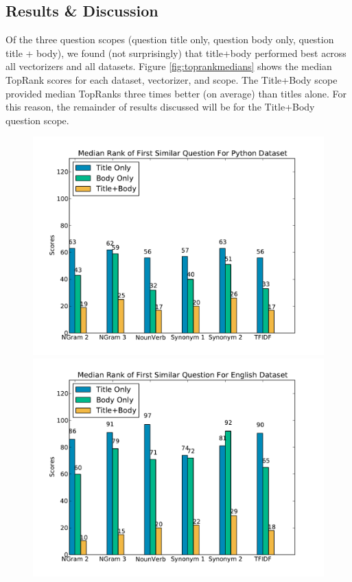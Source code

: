 \documentclass{acm_proc_article-sp}
\begin{document}
\subsection{Results \& Discussion}
Of the three question scopes (question title only, question body only, question title + body), we found (not surprisingly) that title+body performed best across all vectorizers and all datasets. Figure \ref{fig:toprankmedians} shows the median TopRank scores for each dataset, vectorizer, and scope. The Title+Body scope provided median TopRanks three times better (on average) than titles alone. For this reason, the remainder of results discussed will be for the Title+Body question scope.

\begin{figure}[!htb]
\centering
{}
\includegraphics[width=1.1\linewidth]{images/Python_all-toprank-medians_plot.pdf}
\endminipage\hfill
{}
\includegraphics[width=1.1\linewidth]{images/English_all-toprank-medians_plot.pdf}

\end{figure}
\end{document}
